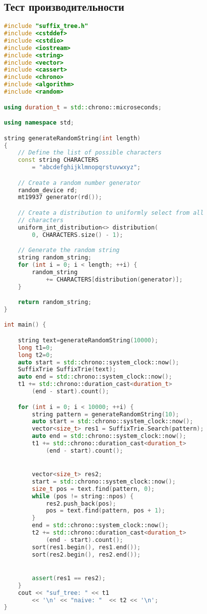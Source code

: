 \documentclass[12pt]{article}
\begin{document}
\subsection*{Тест производительности}

\begin{lstlisting}[language=C++]
#include "suffix_tree.h"
#include <cstddef>
#include <cstdio>
#include <iostream>
#include <string>
#include <vector>
#include <cassert>
#include <chrono>
#include <algorithm>
#include <random>

using duration_t = std::chrono::microseconds;

using namespace std;

string generateRandomString(int length)
{
    // Define the list of possible characters
    const string CHARACTERS
        = "abcdefghijklmnopqrstuvwxyz";

    // Create a random number generator
    random_device rd;
    mt19937 generator(rd());

    // Create a distribution to uniformly select from all
    // characters
    uniform_int_distribution<> distribution(
        0, CHARACTERS.size() - 1);

    // Generate the random string
    string random_string;
    for (int i = 0; i < length; ++i) {
        random_string
            += CHARACTERS[distribution(generator)];
    }

    return random_string;
}

int main() {

    string text=generateRandomString(10000);
    long t1=0;
    long t2=0;
    auto start = std::chrono::system_clock::now();
    SuffixTrie SuffixTrie(text); 
    auto end = std::chrono::system_clock::now();
    t1 += std::chrono::duration_cast<duration_t>
        (end - start).count();

    for (int i = 0; i < 10000; ++i) {
        string pattern = generateRandomString(10);
        auto start = std::chrono::system_clock::now();
        vector<size_t> res1 = SuffixTrie.Search(pattern);
        auto end = std::chrono::system_clock::now();
        t1 += std::chrono::duration_cast<duration_t>
            (end - start).count();


        vector<size_t> res2;
        start = std::chrono::system_clock::now();
        size_t pos = text.find(pattern, 0);
        while (pos != string::npos) {
            res2.push_back(pos);
            pos = text.find(pattern, pos + 1);
        }
        end = std::chrono::system_clock::now();
        t2 += std::chrono::duration_cast<duration_t>
            (end - start).count();
        sort(res1.begin(), res1.end());
        sort(res2.begin(), res2.end());


        assert(res1 == res2);
    }
    cout << "suf_tree: " << t1 
        << '\n' << "naive: "  << t2 << '\n';
}
\end{lstlisting}
\end{document}
